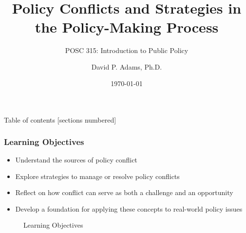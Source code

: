 \documentclass[10pt]{beamer}
\title{Policy Conflicts and Strategies in the Policy-Making Process}
\subtitle{POSC 315: Introduction to Public Policy}
\date{\today}
\author{David P. Adams, Ph.D.}
\institute{California State University, Fullerton}
\begin{document}
\maketitle

\begin{frame}{Table of contents}
  [sections numbered]
  \tableofcontents[hideallsubsections]
\end{frame}

\begin{frame}
    \frametitle{Learning Objectives}
    \begin{itemize}
        \item Understand the \alert{sources} of policy conflict
        \item Explore \alert{strategies} to manage or resolve policy conflicts
        \item Reflect on how conflict can serve as both a \alert{challenge} and an \alert{opportunity}
        \item Develop a foundation for applying these concepts to \alert{real-world policy issues}
    \end{itemize}
    
    \begin{figure}
        \centering
        \caption{Learning Objectives}
    \end{figure}
\end{frame}
\end{document}
